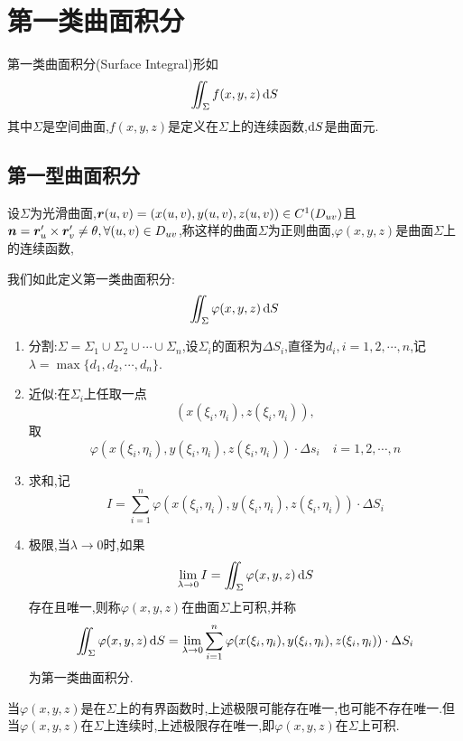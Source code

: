 \setcounter{chapter}{25} %

\chapter{第一类曲面积分}

第一类曲面积分(Surface Integral)形如$$\iint_{\Sigma} f(x,y,z) \operatorname{d\!} S$$
其中$\Sigma$是空间曲面,$f(x,y,z)$是定义在$\Sigma$上的连续函数,$\operatorname{d\!} S$是曲面元.

\section{第一型曲面积分}

设$\Sigma$为光滑曲面,$\bm{r}(u,v) = (x(u,v),y(u,v),z(u,v)) \in C^1(D_{uv})$且$\bm{n} = \bm{r}_u' \times \bm{r}_v' \neq \theta, \forall (u,v) \in D_{uv}$,称这样的曲面$\Sigma$为正则曲面,$\varphi(x,y,z)$是曲面$\Sigma$上的连续函数,

\begin{definition}
    我们如此定义第一类曲面积分:
    $$\iint_{\Sigma} \varphi(x,y,z) \operatorname{d\!} S$$

    \begin{enumerate}
        \item 分割:$\Sigma = \Sigma_1 \cup \Sigma_2 \cup \cdots \cup \Sigma_n$,设$\Sigma_i$的面积为$\Delta S_i$,直径为$d_i, i = 1,2,\cdots,n$,记$\lambda = \max\{ d_1,d_2,\cdots,d_n\}$.
        \item 近似:在$\Sigma_i$上任取一点$$\left( x(\xi_i,\eta_i),z(\xi_i,\eta_i) \right),$$
        取
        $$\varphi(x(\xi_i,\eta_i),y(\xi_i,\eta_i),z(\xi_i,\eta_i)) \cdot \Delta s_i \quad i= 1,2,\cdots,n$$
        \item 求和,记
        $$I = \sum_{i=1}^n \varphi(x(\xi_i,\eta_i),y(\xi_i,\eta_i),z(\xi_i,\eta_i)) \cdot \Delta S_i$$
        \item 极限,当$\lambda \to 0$时,如果$$\lim_{\lambda \to 0} I = \iint_{\Sigma} \varphi(x,y,z) \operatorname{d\!} S$$存在且唯一,则称$\varphi(x,y,z)$在曲面$\Sigma$上可积,并称$$\iint_{\Sigma} \varphi(x,y,z) \operatorname{d\!} S = \lim_{\lambda \to 0} \sum_{i=1}^n \varphi(x(\xi_i,\eta_i),y(\xi_i,\eta_i),z(\xi_i,\eta_i)) \cdot \Delta S_i$$为第一类曲面积分.
    \end{enumerate}
\end{definition}


当$\varphi(x,y,z)$是在$\Sigma$上的有界函数时,上述极限可能存在唯一,也可能不存在唯一.但当$\varphi(x,y,z)$在$\Sigma$上连续时,上述极限存在唯一,即$\varphi(x,y,z)$在$\Sigma$上可积.

